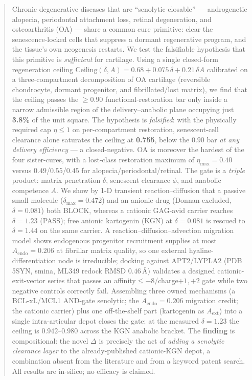 \documentclass[11pt,a4paper]{article}
\begin{document}
\begin{abstract}
Chronic degenerative diseases that are ``senolytic-closable'' --- androgenetic
alopecia, periodontal attachment loss, retinal degeneration, and osteoarthritis
(OA) --- share a common cure primitive: clear the senescence-locked cells that
suppress a dormant regenerative program, and the tissue's own neogenesis
restarts. We test the falsifiable hypothesis that this primitive is
\emph{sufficient} for cartilage. Using a single closed-form regeneration ceiling
$\mathrm{Ceiling}(\delta,A)=0.68+0.075\,\delta+0.21\,\delta A$ calibrated on a
three-compartment decomposition of OA cartilage (reversible chondrocyte, dormant
progenitor, and fibrillated/lost matrix), we find that the ceiling passes the
$\geq0.90$ functional-restoration bar only inside a narrow admissible region of
the delivery--anabolic plane occupying just \textbf{3.8\%} of the unit square.
The hypothesis is \emph{falsified}: with the physically required cap
$\eta\le1$ on per-compartment restoration, senescent-cell clearance alone
saturates the ceiling at \textbf{0.755}, below the $0.90$ bar \emph{at any
delivery efficiency} --- a closed-negative. OA is moreover the hardest of the
four sister-cures, with a lost-class restoration maximum of $\eta_{\max}=0.40$
versus $0.49$/$0.55$/$0.45$ for alopecia/periodontal/retinal. The gate is a
\emph{triple} product: matrix penetration $\delta$, senescent clearance $\phi$,
and anabolic competence $A$. We show by 1-D transient reaction--diffusion that a
passive small molecule ($\delta_{\max}=0.472$) and an anionic drug (Donnan-excluded,
$\delta=0.081$) both BLOCK, whereas a cationic GAG-avid carrier reaches
$\delta=1.23$ (PASS); free anionic kartogenin (KGN) at $\delta=0.081$ is rescued
to $\delta=1.44$ on the same carrier. A reaction--diffusion--advection migration
model shows endogenous progenitor recruitment supplies at most $A_{\mathrm{endo}}=0.206$
at fibrillar matrix quality, so one external hyaline-differentiation node is
irreducible; docking against APT2/LYPLA2 (PDB 5SYN, smina, ML349 redock RMSD
$0.46$\,\AA) validates a designed cationic-exit-vector series that passes an
affinity$\le-8$/charge$+1{,}+2$ gate while two negative controls correctly fail.
Assembling three owned mechanisms (a BCL-xL/MCL1 AND-gate senolytic; the
$A_{\mathrm{endo}}=0.206$ migration credit; the cationic carrier) plus one
off-the-shelf part (kartogenin as $A_{\mathrm{ext}}$) into a single
intra-articular depot closes the gate: at the measured $\delta=1.23$ the ceiling
is $0.942$--$0.980$ across the KGN anabolic bracket. The \textbf{finding} is
compositional: the novel $\Delta$ is precisely the act of \emph{adding a
senolytic clearance layer} to the already-published cationic-KGN depot, a
combination absent from the literature and from a keyword patent search. All
results are in-silico; no efficacy is claimed.
\end{abstract}
\end{document}
